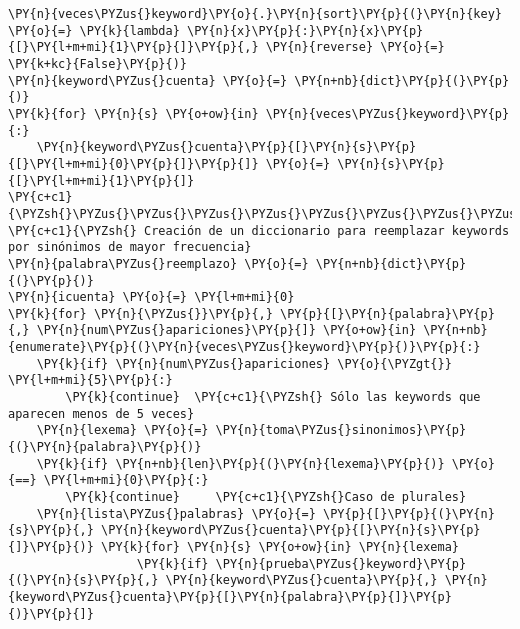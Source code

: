     \begin{tcolorbox}[breakable, size=fbox, boxrule=1pt, pad at break*=1mm,colback=cellbackground, colframe=cellborder]
\begin{Verbatim}[commandchars=\\\{\}]
\PY{n}{veces\PYZus{}keyword}\PY{o}{.}\PY{n}{sort}\PY{p}{(}\PY{n}{key} \PY{o}{=} \PY{k}{lambda} \PY{n}{x}\PY{p}{:}\PY{n}{x}\PY{p}{[}\PY{l+m+mi}{1}\PY{p}{]}\PY{p}{,} \PY{n}{reverse} \PY{o}{=} \PY{k+kc}{False}\PY{p}{)}
\PY{n}{keyword\PYZus{}cuenta} \PY{o}{=} \PY{n+nb}{dict}\PY{p}{(}\PY{p}{)}
\PY{k}{for} \PY{n}{s} \PY{o+ow}{in} \PY{n}{veces\PYZus{}keyword}\PY{p}{:}
    \PY{n}{keyword\PYZus{}cuenta}\PY{p}{[}\PY{n}{s}\PY{p}{[}\PY{l+m+mi}{0}\PY{p}{]}\PY{p}{]} \PY{o}{=} \PY{n}{s}\PY{p}{[}\PY{l+m+mi}{1}\PY{p}{]}
\PY{c+c1}{\PYZsh{}\PYZus{}\PYZus{}\PYZus{}\PYZus{}\PYZus{}\PYZus{}\PYZus{}\PYZus{}\PYZus{}\PYZus{}\PYZus{}\PYZus{}\PYZus{}\PYZus{}\PYZus{}\PYZus{}\PYZus{}\PYZus{}\PYZus{}\PYZus{}\PYZus{}\PYZus{}\PYZus{}\PYZus{}\PYZus{}\PYZus{}\PYZus{}\PYZus{}\PYZus{}\PYZus{}\PYZus{}\PYZus{}\PYZus{}\PYZus{}\PYZus{}\PYZus{}\PYZus{}\PYZus{}\PYZus{}\PYZus{}\PYZus{}\PYZus{}\PYZus{}\PYZus{}\PYZus{}\PYZus{}\PYZus{}\PYZus{}\PYZus{}\PYZus{}\PYZus{}\PYZus{}\PYZus{}\PYZus{}\PYZus{}\PYZus{}\PYZus{}\PYZus{}\PYZus{}\PYZus{}\PYZus{}\PYZus{}\PYZus{}\PYZus{}\PYZus{}\PYZus{}\PYZus{}\PYZus{}\PYZus{}\PYZus{}\PYZus{}\PYZus{}\PYZus{}\PYZus{}}
\PY{c+c1}{\PYZsh{} Creación de un diccionario para reemplazar keywords por sinónimos de mayor frecuencia}
\PY{n}{palabra\PYZus{}reemplazo} \PY{o}{=} \PY{n+nb}{dict}\PY{p}{(}\PY{p}{)}
\PY{n}{icuenta} \PY{o}{=} \PY{l+m+mi}{0}
\PY{k}{for} \PY{n}{\PYZus{}}\PY{p}{,} \PY{p}{[}\PY{n}{palabra}\PY{p}{,} \PY{n}{num\PYZus{}apariciones}\PY{p}{]} \PY{o+ow}{in} \PY{n+nb}{enumerate}\PY{p}{(}\PY{n}{veces\PYZus{}keyword}\PY{p}{)}\PY{p}{:}
    \PY{k}{if} \PY{n}{num\PYZus{}apariciones} \PY{o}{\PYZgt{}} \PY{l+m+mi}{5}\PY{p}{:}
        \PY{k}{continue}  \PY{c+c1}{\PYZsh{} Sólo las keywords que aparecen menos de 5 veces}
    \PY{n}{lexema} \PY{o}{=} \PY{n}{toma\PYZus{}sinonimos}\PY{p}{(}\PY{n}{palabra}\PY{p}{)}
    \PY{k}{if} \PY{n+nb}{len}\PY{p}{(}\PY{n}{lexema}\PY{p}{)} \PY{o}{==} \PY{l+m+mi}{0}\PY{p}{:}
        \PY{k}{continue}     \PY{c+c1}{\PYZsh{}Caso de plurales}
    \PY{n}{lista\PYZus{}palabras} \PY{o}{=} \PY{p}{[}\PY{p}{(}\PY{n}{s}\PY{p}{,} \PY{n}{keyword\PYZus{}cuenta}\PY{p}{[}\PY{n}{s}\PY{p}{]}\PY{p}{)} \PY{k}{for} \PY{n}{s} \PY{o+ow}{in} \PY{n}{lexema} 
                  \PY{k}{if} \PY{n}{prueba\PYZus{}keyword}\PY{p}{(}\PY{n}{s}\PY{p}{,} \PY{n}{keyword\PYZus{}cuenta}\PY{p}{,} \PY{n}{keyword\PYZus{}cuenta}\PY{p}{[}\PY{n}{palabra}\PY{p}{]}\PY{p}{)}\PY{p}{]}

\end{Verbatim}
\end{tcolorbox}
